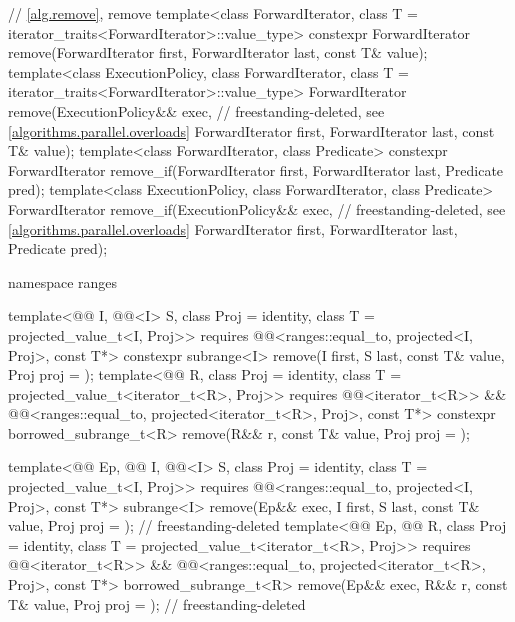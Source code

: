 \begin{codeblock}
{  // \ref{alg.remove}, remove
  template<class ForwardIterator, class T = iterator_traits<ForwardIterator>::value_type>
    constexpr ForwardIterator remove(ForwardIterator first, ForwardIterator last,
                                     const T& value);
  template<class ExecutionPolicy, class ForwardIterator,
           class T = iterator_traits<ForwardIterator>::value_type>
    ForwardIterator remove(ExecutionPolicy&& exec,              // freestanding-deleted, see \ref{algorithms.parallel.overloads}
                           ForwardIterator first, ForwardIterator last,
                           const T& value);
  template<class ForwardIterator, class Predicate>
    constexpr ForwardIterator remove_if(ForwardIterator first, ForwardIterator last,
                                        Predicate pred);
  template<class ExecutionPolicy, class ForwardIterator, class Predicate>
    ForwardIterator remove_if(ExecutionPolicy&& exec,           // freestanding-deleted, see \ref{algorithms.parallel.overloads}
                              ForwardIterator first, ForwardIterator last,
                              Predicate pred);

  namespace ranges {
    template<@@ I, @@<I> S, class Proj = identity,
             class T = projected_value_t<I, Proj>>
      requires @@<ranges::equal_to, projected<I, Proj>, const T*>
      constexpr subrange<I> remove(I first, S last, const T& value, Proj proj = {});
    template<@@ R, class Proj = identity,
             class T = projected_value_t<iterator_t<R>, Proj>>
      requires @@<iterator_t<R>> &&
               @@<ranges::equal_to,
                                         projected<iterator_t<R>, Proj>, const T*>
      constexpr borrowed_subrange_t<R>
        remove(R&& r, const T& value, Proj proj = {});

    template<@@ Ep, @@ I, @@<I> S,
             class Proj = identity, class T = projected_value_t<I, Proj>>
      requires @@<ranges::equal_to, projected<I, Proj>, const T*>
      subrange<I> remove(Ep&& exec, I first, S last, const T& value,
                         Proj proj = {});                                   // freestanding-deleted
    template<@@ Ep, @@ R, class Proj = identity,
             class T = projected_value_t<iterator_t<R>, Proj>>
      requires @@<iterator_t<R>> &&
               @@<ranges::equal_to,
                                         projected<iterator_t<R>, Proj>, const T*>
      borrowed_subrange_t<R>
        remove(Ep&& exec, R&& r, const T& value, Proj proj = {});           // freestanding-deleted

}}
\end{codeblock}
